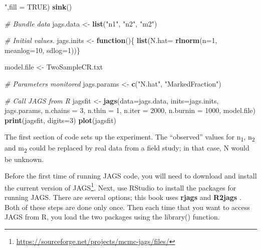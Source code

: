 \documentclass[
]{krantz}
\makeatletter
\newenvironment{Shaded}{\begin{snugshade}}{\end{snugshade}}
\newcommand{\AttributeTok}[1]{\textcolor[rgb]{0.27,0.27,0.27}{#1}}
\newcommand{\CommentTok}[1]{\textcolor[rgb]{0.37,0.37,0.37}{\textit{#1}}}
\newcommand{\ConstantTok}[1]{\textcolor[rgb]{0.37,0.37,0.37}{#1}}
\newcommand{\ControlFlowTok}[1]{\textcolor[rgb]{0.27,0.27,0.27}{\textbf{#1}}}
\newcommand{\DecValTok}[1]{\textcolor[rgb]{0.06,0.06,0.06}{#1}}
\newcommand{\FunctionTok}[1]{\textcolor[rgb]{0.27,0.27,0.27}{\textbf{#1}}}
\newcommand{\NormalTok}[1]{#1}
\newcommand{\OtherTok}[1]{\textcolor[rgb]{0.37,0.37,0.37}{#1}}
\newcommand{\StringTok}[1]{\textcolor[rgb]{0.5,0.5,0.5}{#1}}
\renewcommand{\href}[2]{#2\footnote{\url{#1}}}
\newenvironment{kframe}{%
\medskip{}
\setlength{\fboxsep}{.8em}
 \def\at@end@of@kframe{}%
 \ifinner\ifhmode%
  \def\at@end@of@kframe{\end{minipage}}%
  \begin{minipage}{\columnwidth}%
 \fi\fi%
 \def\FrameCommand##1{\hskip\@totalleftmargin \hskip-\fboxsep
 \colorbox{shadecolor}{##1}\hskip-\fboxsep
     \hskip-\linewidth \hskip-\@totalleftmargin \hskip\columnwidth}%
 \MakeFramed {\advance\hsize-\width
   \@totalleftmargin\z@ \linewidth\hsize
   \@setminipage}}%
 {\par\unskip\endMakeFramed%
 \at@end@of@kframe}
\renewenvironment{Shaded}{\begin{kframe}}{\end{kframe}}
\makeatother
\begin{document}
\begin{Shaded}
\begin{Highlighting}[]
\StringTok{    "}\NormalTok{,}\AttributeTok{fill =} \ConstantTok{TRUE}\NormalTok{)}
\FunctionTok{sink}\NormalTok{()}

\CommentTok{\# Bundle data}
\NormalTok{jags.data }\OtherTok{\textless{}{-}} \FunctionTok{list}\NormalTok{(}\StringTok{"n1"}\NormalTok{, }\StringTok{"n2"}\NormalTok{, }\StringTok{"m2"}\NormalTok{)}

\CommentTok{\# Initial values.}
\NormalTok{jags.inits }\OtherTok{\textless{}{-}} \ControlFlowTok{function}\NormalTok{()\{ }\FunctionTok{list}\NormalTok{(}\AttributeTok{N.hat=} \FunctionTok{rlnorm}\NormalTok{(}\AttributeTok{n=}\DecValTok{1}\NormalTok{, }\AttributeTok{meanlog=}\DecValTok{10}\NormalTok{, }\AttributeTok{sdlog=}\DecValTok{1}\NormalTok{))\}}

\NormalTok{model.file }\OtherTok{\textless{}{-}} \StringTok{\textquotesingle{}TwoSampleCR.txt\textquotesingle{}}

\CommentTok{\# Parameters monitored}
\NormalTok{jags.params }\OtherTok{\textless{}{-}} \FunctionTok{c}\NormalTok{(}\StringTok{"N.hat"}\NormalTok{, }\StringTok{"MarkedFraction"}\NormalTok{)}

\CommentTok{\# Call JAGS from R}
\NormalTok{jagsfit }\OtherTok{\textless{}{-}} \FunctionTok{jags}\NormalTok{(}\AttributeTok{data=}\NormalTok{jags.data, }\AttributeTok{inits=}\NormalTok{jags.inits, jags.params,}
                \AttributeTok{n.chains =} \DecValTok{3}\NormalTok{, }\AttributeTok{n.thin =} \DecValTok{1}\NormalTok{, }\AttributeTok{n.iter =} \DecValTok{2000}\NormalTok{, }\AttributeTok{n.burnin =} \DecValTok{1000}\NormalTok{,}
\NormalTok{                model.file)}
\FunctionTok{print}\NormalTok{(jagsfit, }\AttributeTok{digits=}\DecValTok{3}\NormalTok{)}
\FunctionTok{plot}\NormalTok{(jagsfit)}
\end{Highlighting}
\end{Shaded}

The first section of code sets up the experiment. The ``observed'' values for n\textsubscript{1}, n\textsubscript{2} and m\textsubscript{2} could be replaced by real data from a field study; in that case, N would be unknown.

Before the first time of running JAGS code, you will need to download and install the current version of \href{https://sourceforge.net/projects/mcmc-jags/files/}{JAGS}. Next, use RStudio to install the packages for running JAGS. There are several options; this book uses \textbf{rjags} \citep{R-rjags} and \textbf{R2jags} \citep{R-R2jags}. Both of these steps are done only once. Then each time that you want to access JAGS from R, you load the two packages using the library() function.
\end{document}
